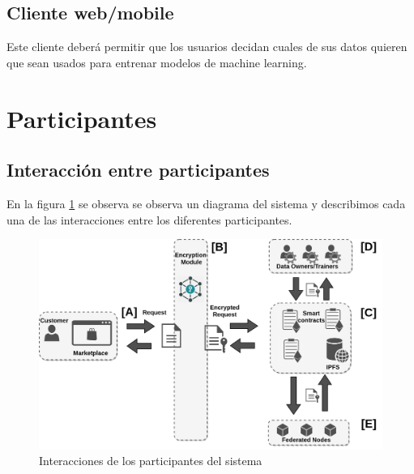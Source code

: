 \documentclass[
11pt, %
oneside, %
spanish, %
singlespacing, %
parskip, %
headsepline, %
chapterinoneline, %
]{MastersDoctoralThesis} %
\begin{document}
\subsection*{Cliente web/mobile}
Este cliente deberá permitir que los usuarios decidan cuales de sus datos quieren que sean usados para entrenar modelos de machine learning.

\newpage

\section{Participantes}

\subsection*{Interacción entre participantes}
En la figura \ref{fig:interact} se observa se observa un diagrama del sistema y describimos cada una de las interacciones entre los diferentes participantes.

\begin{figure}[h!]
  	\centering
	\includegraphics[scale=0.3]{imgs/proposal-diagram.png}
	\caption{Interacciones de los participantes del sistema}
	\label{fig:interact}
\end{figure}
\end{document}
